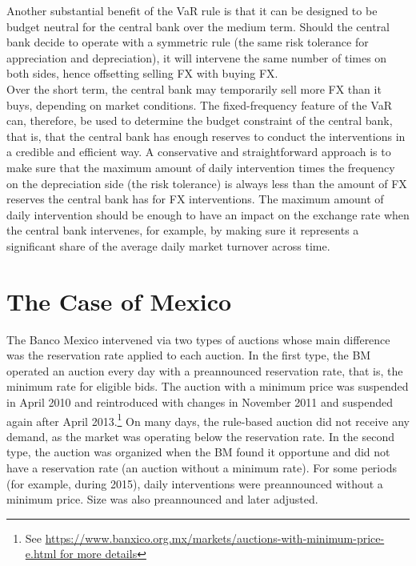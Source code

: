 \documentclass[11pt]{article}
\begin{document}
Another substantial benefit of  the VaR rule is that it can  be designed to be
budget neutral for  the central bank over the medium  term. Should the central
bank decide  to operate  with a  symmetric rule (the  same risk  tolerance for
appreciation and depreciation), it will intervene  the same number of times on
both sides, hence offsetting selling FX with buying FX.\\

Over the  short term, the  central bank may temporarily  sell more FX  than it
buys, depending on  market conditions. The fixed-frequency feature  of the VaR
can, therefore,  be used  to determine  the budget  constraint of  the central
bank,  that is,  that the  central  bank has  enough reserves  to conduct  the
interventions  in   a  credible   and  efficient   way.  A   conservative  and
straightforward approach  is to  make sure  that the  maximum amount  of daily
intervention times the frequency on the depreciation side (the risk tolerance)
is always  less than the  amount of  FX reserves the  central bank has  for FX
interventions. The  maximum amount of  daily intervention should be  enough to
have an  impact on  the exchange  rate when the  central bank  intervenes, for
example, by making sure it represents a significant share of the average daily
market turnover across time.\\



\section{The Case of Mexico}
\label{sec:mexico-case}

The Banco  Mexico intervened via two  types of auctions whose  main difference
was the reservation  rate applied to each  auction. In the first  type, the BM
operated an auction  every day with a preannounced reservation  rate, that is,
the  minimum rate  for eligible  bids. The  auction with  a minimum  price was
suspended in  April 2010 and  reintroduced with  changes in November  2011 and
suspended         again         after         April         2013.\footnote{See
\url{https://www.banxico.org.mx/markets/auctions-with-minimum-price-e.html for
more  details}} On  many  days, the  rule-based auction  did  not receive  any
demand, as the market was operating  below the reservation rate. In the second
type, the  auction was organized  when the BM found  it opportune and  did not
have a reservation rate (an auction  without a minimum rate). For some periods
(for example,  during 2015), daily  interventions were preannounced  without a
minimum price. Size was also preannounced and later adjusted.\\
\end{document}
